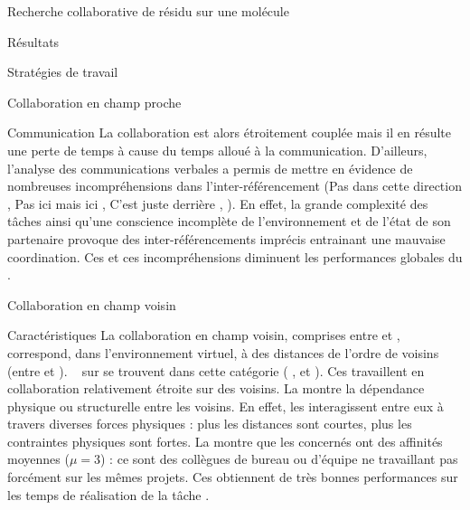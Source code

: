 \documentclass[myfrancais,ngerman,english,french]{mythesis}
\begin{document}
\begin{mychapter}{Recherche collaborative de résidu sur une molécule}
\begin{mysection}{Résultats}
\begin{mysubsection}{Stratégies de travail}
\begin{mysubsubsection}{Collaboration en champ proche}
\begin{myparagraph}{Communication}
						La collaboration est alors étroitement couplée mais il en résulte une perte de temps à cause du temps alloué à la communication.
						D'ailleurs, l'analyse des communications verbales a permis de mettre en évidence de nombreuses incompréhensions dans l'inter-référencement (\og Pas dans cette direction \fg, \og Pas ici mais ici \fg, \og C'est juste derrière \fg, \myetc).
						En effet, la grande complexité des tâches ainsi qu'une conscience incomplète de l'environnement et de l'état de son partenaire provoque des inter-référencements imprécis entrainant une mauvaise coordination.
						Ces  et ces incompréhensions diminuent les performances globales du .
					\end{myparagraph}
				\end{mysubsubsection}
				\begin{mysubsubsection}{Collaboration en champ voisin}
					\begin{myparagraph}{Caractéristiques}
						La collaboration en champ voisin, comprises entre  et , correspond, dans l'environnement virtuel, à des distances de l'ordre de  voisins (entre  et ).
						~ sur  se trouvent dans cette catégorie ( ,  et ).
						Ces  travaillent en collaboration relativement étroite sur des  voisins.
						La  montre la dépendance physique ou structurelle entre les  voisins.
						En effet, les  interagissent entre eux à travers diverses forces physiques : plus les distances sont courtes, plus les contraintes physiques sont fortes.
						La  montre que les  concernés ont des affinités moyennes ($\mu = 3$) : ce sont des collègues de bureau ou d'équipe ne travaillant pas forcément sur les mêmes projets.
						Ces  obtiennent de très bonnes performances sur les temps de réalisation de la tâche .


\end{myparagraph}
\end{mysubsubsection}
\end{mysubsection}
\end{mysection}
\end{mychapter}
\end{document}
